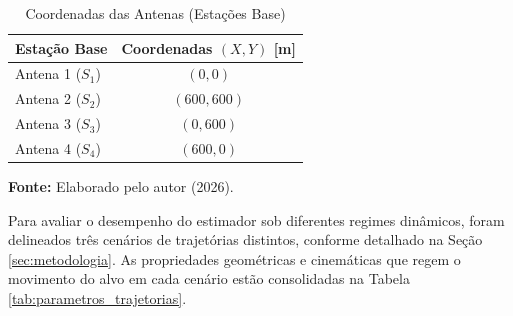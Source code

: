 \documentclass[journal]{IEEEtran}
\begin{document}
\begin{table}[H]
    \centering
    \caption{Coordenadas das Antenas (Estações Base)}
    \label{tab:pos_antenas}
    \begin{tabular}{@{}lc@{}}
        \toprule
        \textbf{Estação Base} & \textbf{Coordenadas $(X, Y)$ [m]} \\ 
        \midrule
        Antena 1 ($S_1$) & $(0, 0)$ \\
        Antena 2 ($S_2$) & $(600, 600)$ \\
        Antena 3 ($S_3$) & $(0, 600)$ \\
        Antena 4 ($S_4$) & $(600, 0)$ \\
        \bottomrule
    \end{tabular}
    \vspace{8pt}
    \centerline{\footnotesize \textbf{Fonte:} Elaborado pelo autor (2026).}
\end{table}

Para avaliar o desempenho do estimador sob diferentes regimes dinâmicos, foram delineados três cenários de trajetórias distintos, conforme detalhado na Seção \ref{sec:metodologia}. As propriedades geométricas e cinemáticas que regem o movimento do alvo em cada cenário estão consolidadas na Tabela \ref{tab:parametros_trajetorias}.
\end{document}
